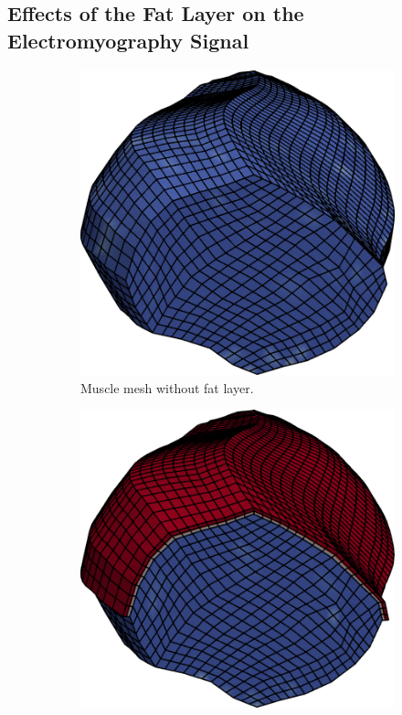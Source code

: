 \subsection{Effects of the Fat Layer on the Electromyography Signal}\label{sec:simfiber_fat}

\begin{figure}[H]
  \centering%
  \begin{subfigure}[t]{0.3\textwidth}%
    \centering%
    \includegraphics[width=\textwidth]{images/results/application/fibers_emg_mesh_no_fat.png}%
    \caption{Muscle mesh without fat layer.}%
    \label{fig:fibers_emg_mesh_no_fat}%
  \end{subfigure} \quad
  \begin{subfigure}[t]{0.3\textwidth}%
    \centering%
    \includegraphics[width=\textwidth]{images/results/application/fibers_emg_mesh_thin_fat.png}%

\end{subfigure}
\end{figure}
